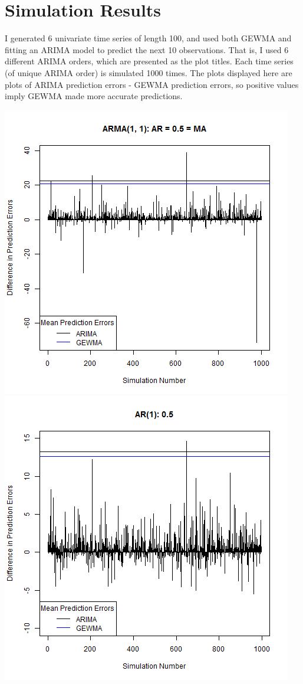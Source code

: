 \documentclass[12pt]{article}
\begin{document}
\section*{Simulation Results}

I generated 6 univariate time series of length 100, and used both GEWMA and fitting an ARIMA model to predict the next 10 observations. That is, I used 6 different ARIMA orders, which are presented as the plot titles. Each time series (of unique ARIMA order) is simulated 1000 times. The plots displayed here are plots of ARIMA prediction errors - GEWMA prediction errors, so positive values imply GEWMA made more accurate predictions.

\begin{center}
\includegraphics[scale=.5]{plot_1.png}\\
\includegraphics[scale=.5]{plot_2.png}\\

\end{center}
\end{document}
